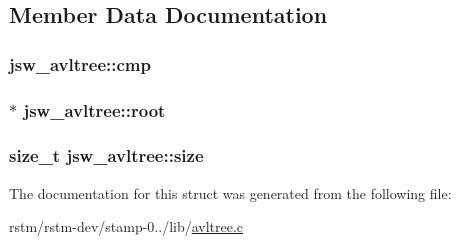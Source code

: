 \subsection{Member Data Documentation}
\hypertarget{structjsw__avltree_a0385af24ec6f7c5485d2354a8c4edc44}{
\subsubsection[{cmp}]{ jsw\-\_\-avltree\-::cmp}}\label{structjsw__avltree_a0385af24ec6f7c5485d2354a8c4edc44}
\hypertarget{structjsw__avltree_af637498e51f5a46215736127701b2d6e}{
\subsubsection[{root}]{$\ast$ jsw\-\_\-avltree\-::root}}\label{structjsw__avltree_af637498e51f5a46215736127701b2d6e}
\hypertarget{structjsw__avltree_afcc98e7908ff3dbfd594599d2e1610be}{
\subsubsection[{size}]{\setlength{\rightskip}{0pt plus 5cm}size\-\_\-t jsw\-\_\-avltree\-::size}}\label{structjsw__avltree_afcc98e7908ff3dbfd594599d2e1610be}


The documentation for this struct was generated from the following file\-:\begin{DoxyCompactItemize}
\item 
rstm/rstm-\/dev/stamp-\/0../lib/\hyperlink{avltree_8c}{avltree.\-c}\end{DoxyCompactItemize}
